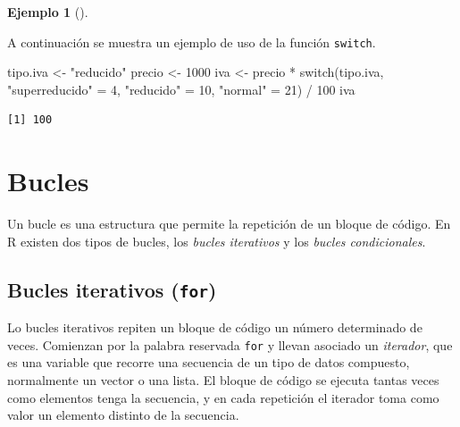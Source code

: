 \documentclass[
  a4paper,
]{scrreport}
\newenvironment{Shaded}{\begin{snugshade}}{\end{snugshade}}
\newcommand{\ControlFlowTok}[1]{\textcolor[rgb]{0.00,0.23,0.31}{#1}}
\newcommand{\DecValTok}[1]{\textcolor[rgb]{0.68,0.00,0.00}{#1}}
\newcommand{\NormalTok}[1]{\textcolor[rgb]{0.00,0.23,0.31}{#1}}
\newcommand{\OtherTok}[1]{\textcolor[rgb]{0.00,0.23,0.31}{#1}}
\newcommand{\SpecialCharTok}[1]{\textcolor[rgb]{0.37,0.37,0.37}{#1}}
\newcommand{\StringTok}[1]{\textcolor[rgb]{0.13,0.47,0.30}{#1}}
\theoremstyle{definition}
\newtheorem{example}{Ejemplo}[chapter]
\theoremstyle{definition}
\theoremstyle{remark}
\begin{document}
\leavevmode{}%
\begin{example}[]\label{exm-condicional-switch}

A continuación se muestra un ejemplo de uso de la función
\texttt{switch}.

\begin{Shaded}
\begin{Highlighting}[]
\NormalTok{tipo.iva }\OtherTok{\textless{}{-}} \StringTok{"reducido"}
\NormalTok{precio }\OtherTok{\textless{}{-}} \DecValTok{1000}
\NormalTok{iva }\OtherTok{\textless{}{-}}\NormalTok{ precio }\SpecialCharTok{*} \ControlFlowTok{switch}\NormalTok{(tipo.iva, }\StringTok{"superreducido"} \OtherTok{=} \DecValTok{4}\NormalTok{, }\StringTok{"reducido"} \OtherTok{=} \DecValTok{10}\NormalTok{, }\StringTok{"normal"} \OtherTok{=} \DecValTok{21}\NormalTok{) }\SpecialCharTok{/} \DecValTok{100}
\NormalTok{iva}
\end{Highlighting}
\end{Shaded}

\begin{verbatim}
[1] 100
\end{verbatim}

\end{example}

\hypertarget{bucles}{%
\section{Bucles}\label{bucles}}

Un bucle es una estructura que permite la repetición de un bloque de
código. En R existen dos tipos de bucles, los \emph{bucles iterativos} y
los \emph{bucles condicionales}.

\hypertarget{bucles-iterativos-for}{%
\subsection{\texorpdfstring{Bucles iterativos
(\texttt{for})}{Bucles iterativos (for)}}\label{bucles-iterativos-for}}

Lo bucles iterativos repiten un bloque de código un número determinado
de veces. Comienzan por la palabra reservada \texttt{for} y llevan
asociado un \emph{iterador}, que es una variable que recorre una
secuencia de un tipo de datos compuesto, normalmente un vector o una
lista. El bloque de código se ejecuta tantas veces como elementos tenga
la secuencia, y en cada repetición el iterador toma como valor un
elemento distinto de la secuencia.
\end{document}
